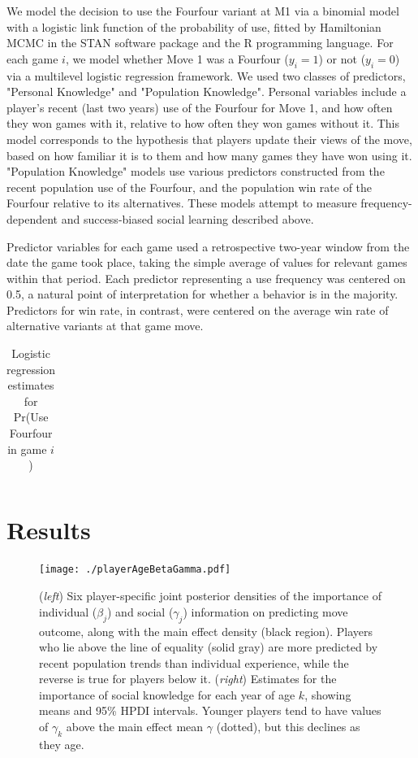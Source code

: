 \documentclass[reqno,12pt]{amsart}
\begin{document}
We model the decision to use the Fourfour variant at M1 via a binomial model with a logistic link function of the probability of use, fitted by Hamiltonian MCMC in the STAN software package \citep{stan2013stan} and the R programming language. For each game $i$, we model whether Move 1 was a Fourfour ($y_i=1$) or not ($y_i=0$) via a multilevel logistic regression framework. We used two classes of predictors, "Personal Knowledge" and "Population Knowledge". Personal variables include a player's recent (last two years) use of the Fourfour for Move 1, and how often they won games with it, relative to how often they won games without it. This model corresponds to the hypothesis that players update their views of the move, based on how familiar it is to them and how many games they have won using it. "Population Knowledge" models use various predictors constructed from the recent population use of the Fourfour, and the population win rate of the Fourfour relative to its alternatives. These models attempt to measure frequency-dependent and success-biased social learning described above.

Predictor variables for each game used a retrospective two-year window from the date the game took place, taking the simple average of values for relevant games within that period. Each predictor representing a use frequency was centered on 0.5, a natural point of interpretation for whether a behavior is in the majority. Predictors for win rate, in contrast, were centered on the average win rate of alternative variants at that game move.

\begin{table}[t]
  \centering
    \begin{tabular}{lrr}
    
    \end{tabular}
  \caption{Logistic regression estimates for Pr(Use Fourfour in game $i$)}
  \label{table:pr44_logistic_coefs}
\end{table}

\section{Results}

\begin{figure}[t]
  \begin{center}
    \texttt{[image: ./playerAgeBetaGamma.pdf]}
    \caption{(\textit{left}) Six player-specific joint posterior densities of the importance of individual ($\beta_j$) and social ($\gamma_j$) information on predicting move outcome, along with the main effect density (black region). Players who lie above the line of equality (solid gray) are more predicted by recent population trends than individual experience, while the reverse is true for players below it. (\textit{right}) Estimates for the importance of social knowledge for each year of age $k$, showing means and 95\% HPDI intervals. Younger players tend to have values of $\gamma_k$ above the main effect mean $\gamma$ (dotted), but this declines as they age.}
  \label{fig:playerAgeBetaGamma}
  \end{center}
\end{figure}
\end{document}
